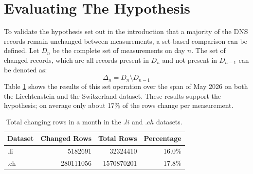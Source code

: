 \section{Evaluating The Hypothesis}

To validate the hypothesis set out in the introduction that a majority 
of the DNS records remain unchanged between measurements, a set-based 
comparison can be defined. Let $D_n$ be the complete set of measurements 
on day $n$. The set of changed records, which are all records present in 
$D_n$ and not present in $D_{n-1}$ can be denoted as:
$$\Delta_n = D_{n} \setminus D_{n-1}$$
Table \ref{tab:measurement_differences} shows the results of this set 
operation over the span of May 2026 on both the Liechtenstein and the Switzerland dataset. 
These results support the hypothesis; on average only about 17\% of the rows change per measurement.

\begin{table}[h]
    \caption{Total changing rows in a month in the $.li$ and $.ch$ datasets.}
    \label{tab:measurement_differences}
    \footnotesize
    \begin{center}
        \begin{tabular}[c]{|l|r|r|r|} \hline
            Dataset & Changed Rows & Total Rows & Percentage \\ \hline
            .li & 5182691 & 32324410 & 16.0\% \\
            .ch & 280111056 & 1570870201 & 17.8\% \\
            
            \hline
        \end{tabular}
    \end{center}
    \vspace*{-2\baselineskip}
\end{table}

